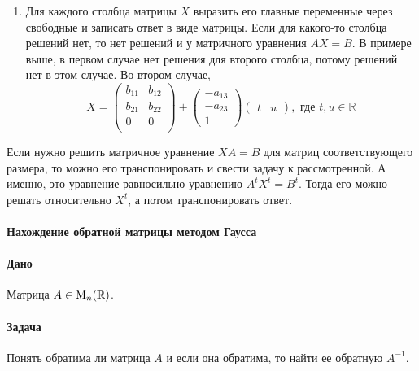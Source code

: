 \begin{enumerate}
\item Для каждого столбца матрицы $X$ выразить его главные переменные через свободные и записать ответ в виде матрицы.
Если для какого-то столбца решений  нет, то нет решений и у матричного уравнения $AX = B$.
В примере выше, в первом случае нет решения для второго столбца, потому решений нет в этом случае.
Во втором случае, 
\[
X = 
\begin{pmatrix}
{b_{11}}&{b_{12}}\\
{b_{21}}&{b_{22}}\\
{0}&{0}\\
\end{pmatrix}
+
\begin{pmatrix}
{-a_{13}}\\{-a_{23}}\\{1}
\end{pmatrix}
\begin{pmatrix}
{t}&{u}
\end{pmatrix},\text{ где } t,u\in \mathbb R
\]
\end{enumerate}

Если нужно решить матричное уравнение $XA = B$ для матриц соответствующего размера, то можно его транспонировать и свести задачу к рассмотренной.
А именно, это уравнение равносильно уравнению $A^t X^t = B^t$.
Тогда его можно решать относительно $X^t$, а потом транспонировать ответ.

\paragraph{Нахождение обратной матрицы методом Гаусса}

\paragraph{Дано}
Матрица $A\in \operatorname{M}_{n}(\mathbb R)$.

\paragraph{Задача}
Понять обратима ли матрица $A$ и если она обратима, то найти ее обратную $A^{-1}$.

